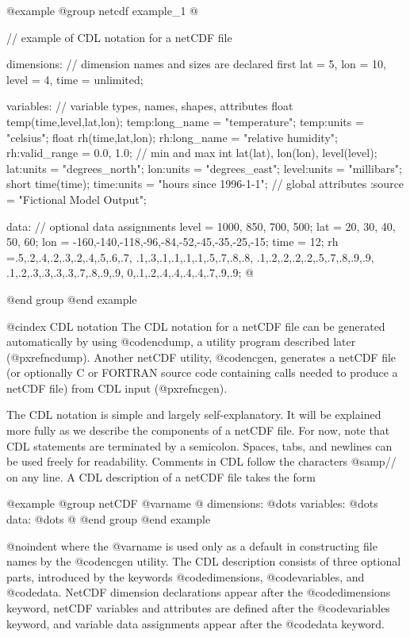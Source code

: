 @example
@group
netcdf example_1 @{  // example of CDL notation for a netCDF file

dimensions:          // dimension names and sizes are declared first
        lat = 5, lon = 10, level = 4, time = unlimited;

variables:           // variable types, names, shapes, attributes
        float   temp(time,level,lat,lon);
                    temp:long_name     = "temperature";
                    temp:units         = "celsius";
        float   rh(time,lat,lon);
                    rh:long_name = "relative humidity";
                    rh:valid_range = 0.0, 1.0;      // min and max
        int     lat(lat), lon(lon), level(level);
                    lat:units       = "degrees_north";
                    lon:units       = "degrees_east";
                    level:units     = "millibars";
        short   time(time);
                    time:units      = "hours since 1996-1-1";
        // global attributes
                    :source = "Fictional Model Output";

data:                // optional data assignments
        level   = 1000, 850, 700, 500;
        lat     = 20, 30, 40, 50, 60;
        lon     = -160,-140,-118,-96,-84,-52,-45,-35,-25,-15;
        time    = 12;
        rh      =.5,.2,.4,.2,.3,.2,.4,.5,.6,.7,
                 .1,.3,.1,.1,.1,.1,.5,.7,.8,.8,
                 .1,.2,.2,.2,.2,.5,.7,.8,.9,.9,
                 .1,.2,.3,.3,.3,.3,.7,.8,.9,.9,
                  0,.1,.2,.4,.4,.4,.4,.7,.9,.9;
@}
@end group
@end example

@cindex CDL notation
The CDL notation for a netCDF file can be generated automatically by
using @code{ncdump}, a utility program described later (@pxref{ncdump}).
Another netCDF utility, @code{ncgen}, generates a netCDF file (or
optionally C or FORTRAN source code containing calls needed to produce a
netCDF file) from CDL input (@pxref{ncgen}).

The CDL notation is simple and largely self-explanatory.
It will be explained more fully as we describe the
components of a netCDF file.  For now, note that CDL statements are
terminated by a semicolon.  Spaces, tabs, and newlines can be used freely
for readability.  Comments in CDL follow the characters @samp{//} on any
line.  A CDL description of a netCDF file takes the form

@example
@group
  netCDF @var{name} @{
    dimensions: @dots{}
    variables: @dots{}
    data: @dots{}
  @}
@end group
@end example

@noindent
where the @var{name} is used only as a default in constructing file names
by the @code{ncgen} utility.  The CDL description
consists of three optional parts, introduced by the keywords
@code{dimensions}, @code{variables}, and @code{data}.  NetCDF dimension
declarations appear after the @code{dimensions} keyword, netCDF
variables and attributes are defined after the @code{variables} keyword,
and variable data assignments appear after the @code{data} keyword.

